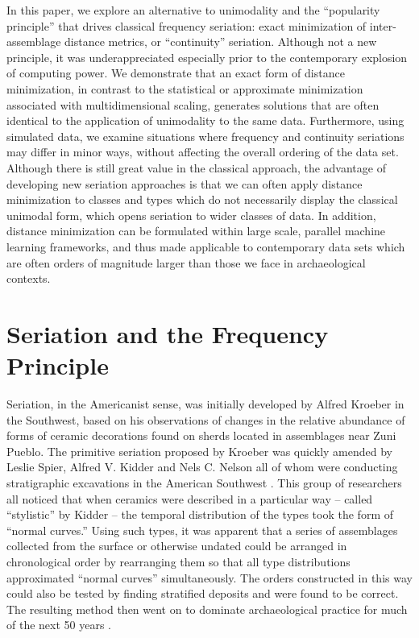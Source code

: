 \documentclass[graybox,natbib]{svmult}
\begin{document}
In this paper, we explore an alternative to unimodality and the
``popularity principle'' that drives classical frequency seriation:
exact minimization of inter-assemblage distance metrics, or
``continuity'' seriation. Although not a new principle, it was
underappreciated especially prior to the contemporary explosion of
computing power. We demonstrate that an exact form of distance
minimization, in contrast to the statistical or approximate minimization
associated with multidimensional scaling, generates solutions that are
often identical to the application of unimodality to the same data.
Furthermore, using simulated data, we examine situations where frequency
and continuity seriations may differ in minor ways, without affecting
the overall ordering of the data set. Although there is still great
value in the classical approach, the advantage of developing new
seriation approaches is that we can often apply distance minimization to
classes and types which do not necessarily display the classical
unimodal form, which opens seriation to wider classes of data. In
addition, distance minimization can be formulated within large scale,
parallel machine learning frameworks, and thus made applicable to
contemporary data sets which are often orders of magnitude larger than
those we face in archaeological contexts.

\section{Seriation and the Frequency
Principle}\label{seriation-and-the-frequency-principle}

Seriation, in the Americanist sense, was initially developed by Alfred
Kroeber \citep{Kroeber1916} in the Southwest, based on his observations
of changes in the relative abundance of forms of ceramic decorations
found on sherds located in assemblages near Zuni Pueblo. The primitive
seriation proposed by Kroeber was quickly amended by Leslie Spier,
Alfred V. Kidder and Nels C. Nelson all of whom were conducting
stratigraphic excavations in the American Southwest
\citep{Kidder1917, Nelson1916, Spier1917}. This group of researchers all
noticed that when ceramics were described in a particular way -- called
``stylistic'' by Kidder \citeyearpar{Kidder1917} -- the temporal
distribution of the types took the form of ``normal curves.'' Using such
types, it was apparent that a series of assemblages collected from the
surface or otherwise undated could be arranged in chronological order by
rearranging them so that all type distributions approximated ``normal
curves'' simultaneously. The orders constructed in this way could also
be tested by finding stratified deposits and were found to be correct.
The resulting method then went on to dominate archaeological practice
for much of the next 50 years \citep{lyman1997rise}.
\end{document}
